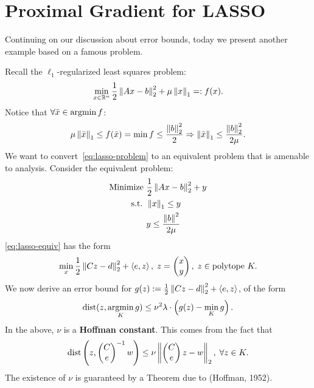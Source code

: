 \section{Proximal Gradient for LASSO}
Continuing on our discussion about error bounds, today we present another
example based on a famous problem.

Recall the $\ell_1$-regularized least squares problem:
\begin{equation}
	\min_{x \in \mathbb{R}^n} \frac{1}{2} \left \| Ax - b \right \|_2^2 + \mu \left \| x \right \|_1
	=: f(x).
	\label{eq:lasso-problem}
\end{equation}
Notice that $\forall \bar{x} \in \operatorname*{argmin} f$:
\[
	\mu \left \| \bar{x} \right \|_1 \leq f(\bar{x})
	= \min f \leq \frac{\left \| b \right \|^2_2}{2} \Rightarrow
	\left \| \bar{x} \right \|_1 \leq \frac{\left \| b \right \|_2^2}{2 \mu}.
\]
We want to convert~\cref{eq:lasso-problem} to an equivalent problem that is
amenable to analysis. Consider the equivalent problem:
\begin{align}
	\begin{aligned}
	\mbox{Minimize } & \frac{1}{2} \left \| Ax - b \right \|_2^2 + y \\
	\mbox{s.t. } & \left \| x \right \|_1 \leq y \\
				 & y \leq \frac{\left \| b \right \|^2}{2\mu}
	\end{aligned}
	\label{eq:lasso-equiv}
\end{align}
\cref{eq:lasso-equiv} has the form
\[
	\min_{x} \frac{1}{2} \left \| Cz - d \right \|_2^2 + \left\langle e, z \right\rangle, \;
	z = \begin{pmatrix} x \\ y \end{pmatrix}, \;
	z \in \text{polytope } K.
\]
We now derive an error bound for $g(z) := \frac{1}{2} \left \| Cz - d \right \|_2^2 +
\left\langle e, z \right\rangle$, of the form
\begin{equation}
	\mathrm{dist}(z, \operatorname*{argmin}_K g) \leq
	\nu^2 \lambda \cdot \left( g(z) - \min_{K} g \right).
	\label{eq:error-bound-lasso}
\end{equation}
In the above, $\nu$ is a \textbf{Hoffman constant}. This comes from the fact
that
\begin{equation}
	\mathrm{dist}\left(z, \begin{pmatrix} C \\ e \end{pmatrix}^{-1} w \right)
	\leq \nu \left \| \begin{pmatrix} C \\ e \end{pmatrix} z - w \right \|_2, \;
	\forall z \in K.
\end{equation}
The existence of $\nu$ is guaranteed by a Theorem due to (Hoffman, 1952).

